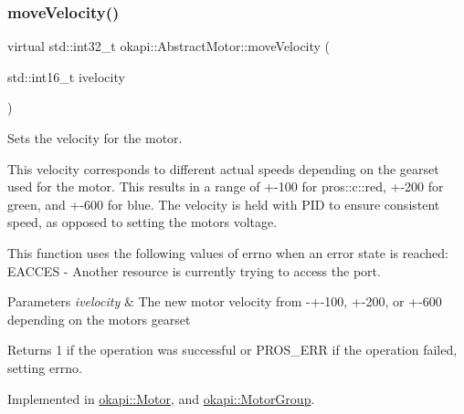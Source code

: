 \mbox{\label{classokapi_1_1AbstractMotor_a3170268f8d06f728327dcda08505e02b}} 
\subsubsection{\texorpdfstring{moveVelocity()}{moveVelocity()}}
{\footnotesize\ttfamily virtual std\+::int32\+\_\+t okapi\+::\+Abstract\+Motor\+::move\+Velocity (\begin{DoxyParamCaption}\item[{std\+::int16\+\_\+t}]{ivelocity }\end{DoxyParamCaption})\hspace{0.3cm}{\ttfamily [pure virtual]}}

Sets the velocity for the motor.

This velocity corresponds to different actual speeds depending on the gearset used for the motor. This results in a range of +-\/100 for pros\+::c\+::red, +-\/200 for green, and +-\/600 for blue. The velocity is held with P\+ID to ensure consistent speed, as opposed to setting the motor\textquotesingle{}s voltage.

This function uses the following values of errno when an error state is reached\+: E\+A\+C\+C\+ES -\/ Another resource is currently trying to access the port.


\begin{DoxyParams}{Parameters}
{\em ivelocity} & The new motor velocity from -\/+-\/100, +-\/200, or +-\/600 depending on the motor\textquotesingle{}s gearset \\
\hline
\end{DoxyParams}
\begin{DoxyReturn}{Returns}
1 if the operation was successful or P\+R\+O\+S\+\_\+\+E\+RR if the operation failed, setting errno. 
\end{DoxyReturn}


Implemented in \mbox{\hyperlink{classokapi_1_1Motor_afc3377b9b10a72de0c22e9a74cbcfd16}{okapi\+::\+Motor}}, and \mbox{\hyperlink{classokapi_1_1MotorGroup_a9f31c14e92efe7ab492b2c335c51b488}{okapi\+::\+Motor\+Group}}.

\mbox{\label{classokapi_1_1AbstractMotor_a15d12555f527109b046c65fe753d7e20}} 
